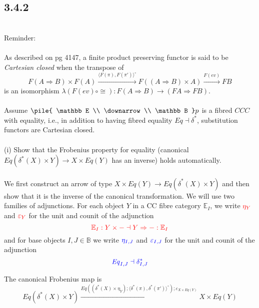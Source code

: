 \documentclass{article}
\newcommand{\red}[1]{\textcolor{red}{#1}}
\newcommand{\blu}[1]{\textcolor{blue}{#1}}
\newcommand{\vrt}[2]{
\pile{
#1 \\
\downarrow \\
#2
}
}
\begin{document}
\subsection*{3.4.2}~\\
Reminder:\\~\\
As described on pg 4147, a finite product preserving functor is said to be \emph{Cartesian closed} when
the transpose of
$$ F(A \Rightarrow B) \times F(A) \overset{\langle F(\pi), F(\pi') \rangle^{\circ}}{\longrightarrow} F((A \Rightarrow B) \times A) \overset{F(ev)}{\longrightarrow} FB$$
is an isomorphism $\lambda(F(ev) \circ \cong) : F(A \Rightarrow B) \to (FA \Rightarrow FB)$.\\~\\
Assume $\vrt{\mathbb E}{\mathbb B}p$ is a fibred $CCC$ with equality, i.e., in addition to having fibred 
equality $Eq \dashv \delta^*$, substitution functors are Cartesian closed.\\~\\
(i) Show that the Frobenius property for equality (canonical $Eq(\delta^*(X) \times Y) \longrightarrow X \times Eq(Y)$ has an inverse) holds automatically.\\~\\

We first construct an arrow of type $X \times \mathit{Eq}(Y) \overset{}{\longrightarrow}  \mathit{Eq(\delta^*(X) \times Y)}$ and then show that it is the inverse of the canonical transformation.
We will use two families of adjunctions. For each object $Y$ in  a CC fibre category $\mathbb E_I$, we write $\red{\eta_Y}$ and $\red{\varepsilon_Y}$ for the unit and counit of the adjunction 
$$\red{\mathbb E_I : Y \times - \dashv Y \Rightarrow - : \mathbb E_I}$$ 
and for base objects $I,J \in \mathbb B$ we write $\blu{\eta_{I,J}}$ and $\blu{\varepsilon_{I,J}}$ for the unit and counit of the adjunction
$$\blu{\mathit{Eq}_{I,J} \dashv \delta_{I,J}^*}$$

The canonical Frobenius map is
$$\mathit{Eq}(\delta^*(X) \times Y) \overset{\mathit{Eq}((\delta^*(X) \times \eta_Y); \langle \delta^*(\pi), \delta^*(\pi') \rangle^{\circ});\varepsilon_{X \times \mathit{Eq}(Y)}}{\longrightarrow} X \times \mathit{Eq}(Y)$$
\end{document}
